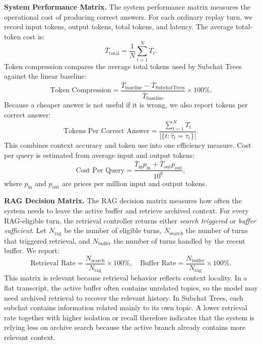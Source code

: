 \documentclass[pdflatex,sn-mathphys-num]{sn-jnl}%
\theoremstyle{thmstyleone}%
\theoremstyle{thmstyletwo}%
\theoremstyle{thmstylethree}%
\begin{document}
\textbf{System Performance Matrix.}
The system performance matrix measures the operational cost of producing correct answers. For each ordinary replay turn, we record input tokens, output tokens, total tokens, and latency. The average total-token cost is:
\begin{equation}
\overline{T}_{\text{total}} = \frac{1}{N}\sum_{t=1}^{N} T_t.
\label{eq:avg_tokens}
\end{equation}
Token compression compares the average total tokens used by Subchat Trees against the linear baseline:
\begin{equation}
\text{Token Compression} = \frac{\overline{T}_{\text{baseline}}-\overline{T}_{\text{SubchatTrees}}}{\overline{T}_{\text{baseline}}}\times100\%.
\label{eq:compression}
\end{equation}
Because a cheaper answer is not useful if it is wrong, we also report tokens per correct answer:
\begin{equation}
\text{Tokens Per Correct Answer} = \frac{\sum_{t=1}^{N} T_t}{|\{t:\hat{\tau}_t=\tau_t\}|}.
\label{eq:tpca}
\end{equation}
This combines context accuracy and token use into one efficiency measure. Cost per query is estimated from average input and output tokens:
\begin{equation}
\text{Cost Per Query} = \frac{\overline{T}_{\text{in}}p_{\text{in}}+\overline{T}_{\text{out}}p_{\text{out}}}{10^6},
\label{eq:cost}
\end{equation}
where $p_{\text{in}}$ and $p_{\text{out}}$ are prices per million input and output tokens.

\textbf{RAG Decision Matrix.}
The RAG decision matrix measures how often the system needs to leave the active buffer and retrieve archived context. For every RAG-eligible turn, the retrieval controller returns either \textit{search triggered} or \textit{buffer sufficient}. Let $N_{\text{rag}}$ be the number of eligible turns, $N_{\text{search}}$ the number of turns that triggered retrieval, and $N_{\text{buffer}}$ the number of turns handled by the recent buffer. We report:
\begin{equation}
\text{Retrieval Rate} = \frac{N_{\text{search}}}{N_{\text{rag}}}\times100\%, \quad
\text{Buffer Rate} = \frac{N_{\text{buffer}}}{N_{\text{rag}}}\times100\%.
\label{eq:rag_rates}
\end{equation}
This matrix is relevant because retrieval behavior reflects context locality. In a flat transcript, the active buffer often contains unrelated topics, so the model may need archived retrieval to recover the relevant history. In Subchat Trees, each subchat contains information related mainly to its own topic. A lower retrieval rate together with higher isolation or recall therefore indicates that the system is relying less on archive search because the active branch already contains more relevant context.
\end{document}
